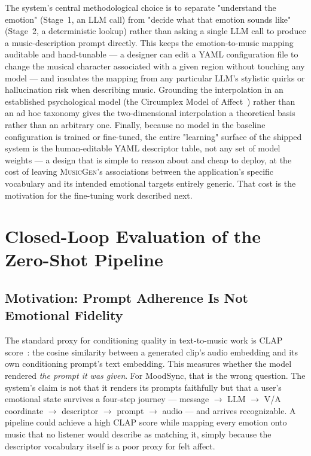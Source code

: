 \documentclass[11pt]{article}
\newcommand{\musicgen}{\textsc{MusicGen}}
\begin{document}
The system's central methodological choice is to separate "understand the emotion" (Stage~1, an LLM call) from "decide what that emotion sounds like" (Stage~2, a deterministic lookup) rather than asking a single LLM call to produce a music-description prompt directly. This keeps the emotion-to-music mapping auditable and hand-tunable --- a designer can edit a YAML configuration file to change the musical character associated with a given region without touching any model --- and insulates the mapping from any particular LLM's stylistic quirks or hallucination risk when describing music. Grounding the interpolation in an established psychological model (the Circumplex Model of Affect~\cite{russell1980circumplex}) rather than an ad hoc taxonomy gives the two-dimensional interpolation a theoretical basis rather than an arbitrary one. Finally, because no model in the baseline configuration is trained or fine-tuned, the entire "learning" surface of the shipped system is the human-editable YAML descriptor table, not any set of model weights --- a design that is simple to reason about and cheap to deploy, at the cost of leaving \musicgen{}'s associations between the application's specific vocabulary and its intended emotional targets entirely generic. That cost is the motivation for the fine-tuning work described next.

\section{Closed-Loop Evaluation of the Zero-Shot Pipeline}
\label{sec:eval}

\subsection{Motivation: Prompt Adherence Is Not Emotional Fidelity}

The standard proxy for conditioning quality in text-to-music work is CLAP score~\cite{wu2023clap}: the cosine similarity between a generated clip's audio embedding and its own conditioning prompt's text embedding. This measures whether the model rendered \emph{the prompt it was given}. For MoodSync, that is the wrong question. The system's claim is not that it renders its prompts faithfully but that a user's emotional state survives a four-step journey --- message $\to$ LLM $\to$ V/A coordinate $\to$ descriptor $\to$ prompt $\to$ audio --- and arrives recognizable. A pipeline could achieve a high CLAP score while mapping every emotion onto music that no listener would describe as matching it, simply because the descriptor vocabulary itself is a poor proxy for felt affect.
\end{document}
